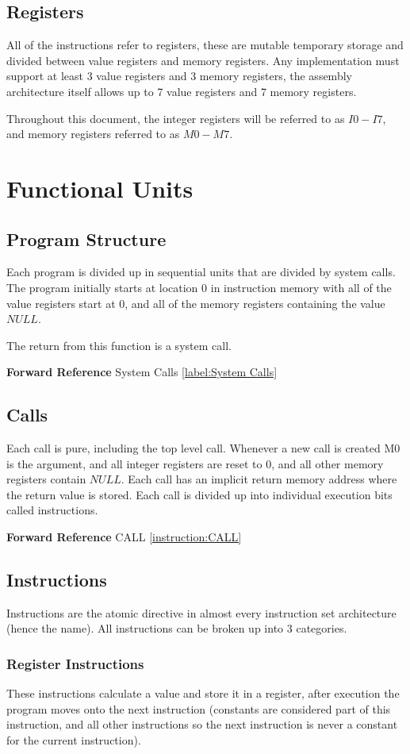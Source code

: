 \documentclass[12pt,letterpaper]{report}
\newcommand{\nil}{NULL}
\newcommand{\SEE}{\textbf{Forward Reference} }
\newcommand{\fref}[2]{#2 \ref{#1:#2}}
\begin{document}
\subsection{Registers}
All of the instructions refer to registers, these are mutable temporary storage and divided between value registers and memory registers. Any implementation must support at least 3 value registers and 3 memory registers, the assembly architecture itself allows up to 7 value registers and 7 memory registers.

Throughout this document, the integer registers will be referred to as $I0 - I7$, and memory registers referred to as $M0 - M7$.
\section{Functional Units}
\subsection{Program Structure}
Each program is divided up in sequential units that are divided by system calls. The program initially starts at location $0$ in instruction memory with all of the value registers start at $0$, and all of the memory registers containing the value $\nil$.

The return from this function is a system call.

\SEE \fref{label}{System Calls}
\subsection{Calls}
\label{label:Calls}
Each call is pure, including the top level call. Whenever a new call is created M0 is the argument, and all integer registers are reset to $0$, and all other memory registers contain $\nil$. Each call has an implicit return memory address where the return value is stored. Each call is divided up into individual execution bits called instructions.

\SEE \fref{instruction}{CALL}
\subsection{Instructions}
Instructions are the atomic directive in almost every instruction set architecture (hence the name). All instructions can be broken up into $3$ categories.
\subsubsection{Register Instructions}
These instructions calculate a value and store it in a register, after execution the program moves onto the next instruction (constants are considered part of this instruction, and all other instructions so the next instruction is never a constant for the current instruction).
\end{document}
